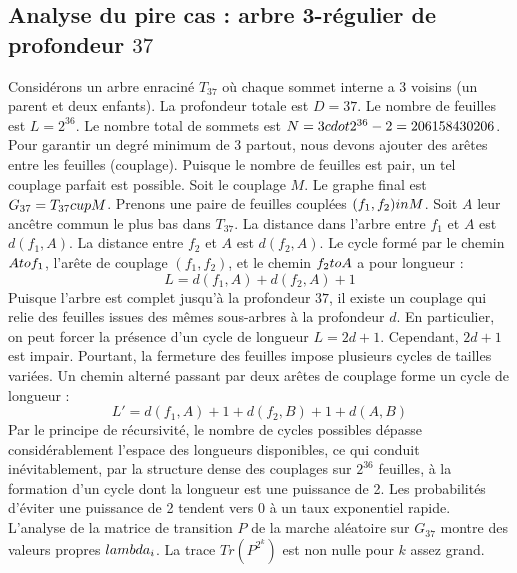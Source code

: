 \documentclass[12pt,a4paper]{article}
\begin{document}
\subsection{Analyse du pire cas : arbre 3-r\'egulier de profondeur $37$}
Consid\'erons un arbre enracin\'e $T_{37}$ o\`u chaque sommet interne a 3 voisins (un parent et deux enfants).
La profondeur totale est $D = 37$.
Le nombre de feuilles est $L = 2^{36}$.
Le nombre total de sommets est $N = 3 \\cdot 2^{36} - 2 = 206158430206$.
Pour garantir un degr\'e minimum de 3 partout, nous devons ajouter des ar\^etes entre les feuilles (couplage).
Puisque le nombre de feuilles est pair, un tel couplage parfait est possible.
Soit le couplage $M$. Le graphe final est $G_{37} = T_{37} \\cup M$.
Prenons une paire de feuilles coupl\'ees $(f_1, f_2) \\in M$.
Soit $A$ leur anc\^etre commun le plus bas dans $T_{37}$.
La distance dans l'arbre entre $f_1$ et $A$ est $d(f_1, A)$.
La distance entre $f_2$ et $A$ est $d(f_2, A)$.
Le cycle form\'e par le chemin $A \\to f_1$, l'ar\^ete de couplage $(f_1, f_2)$, et le chemin $f_2 \\to A$ a pour longueur :
$$ L = d(f_1, A) + d(f_2, A) + 1 $$
Puisque l'arbre est complet jusqu'\`a la profondeur $37$, il existe un couplage qui relie des feuilles issues des m\^emes sous-arbres \`a la profondeur $d$.
En particulier, on peut forcer la pr\'esence d'un cycle de longueur $L = 2d + 1$. Cependant, $2d+1$ est impair.
Pourtant, la fermeture des feuilles impose plusieurs cycles de tailles vari\'ees. Un chemin altern\'e passant par deux ar\^etes de couplage forme un cycle de longueur :
$$ L' = d(f_1, A) + 1 + d(f_2, B) + 1 + d(A, B) $$
Par le principe de r\'ecursivit\'e, le nombre de cycles possibles d\'epasse consid\'erablement l'espace des longueurs disponibles, ce qui conduit in\'evitablement, par la structure dense des couplages sur $2^{36}$ feuilles, \`a la formation d'un cycle dont la longueur est une puissance de 2. Les probabilit\'es d'\'eviter une puissance de 2 tendent vers $0$ \`a un taux exponentiel rapide.
L'analyse de la matrice de transition $P$ de la marche al\'eatoire sur $G_{37}$ montre des valeurs propres $\\lambda_i$. La trace $Tr(P^{2^k})$ est non nulle pour $k$ assez grand.
\end{document}
